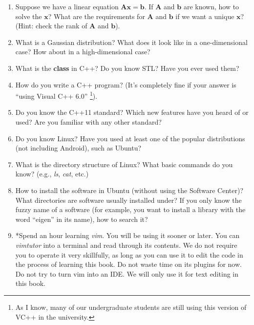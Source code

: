 \begin{English}
    \begin{enumerate}
    	\item Suppose we have a linear equation $\mathbf{Ax}=\mathbf{b}$. If $\mathbf{A}$ and $\mathbf{b}$ are known, how to solve the $\mathbf{x}$? What are the requirements for $\mathbf{A}$ and $\mathbf{b}$ if we want a unique $\mathbf{x}$? (Hint: check the rank of $\mathbf{A}$ and $\mathbf{b}$).
    
    	\item What is a Gaussian distribution? What does it look like in a one-dimensional case? How about in a high-dimensional case?
    
    	\item What is the \textbf{class} in C++? Do you know STL? Have you ever used them?
    
    	\item How do you write a C++ program? (It's completely fine if your answer is ``using Visual C++ 6.0'' \footnote{As I know, many of our undergraduate students are still using this version of VC++ in the university. }).
    
    	\item Do you know the C++11 standard? Which new features have you heard of or used? Are you familiar with any other standard?
    
    	\item Do you know Linux? Have you used at least one of the popular distributions (not including Android), such as Ubuntu?
    
    	\item What is the directory structure of Linux? What basic commands do you know? (e.g., \textit{ls}, \textit{cat}, etc.)
    
    	\item How to install the software in Ubuntu (without using the Software Center)? What directories are software usually installed under? If you only know the fuzzy name of a software (for example, you want to install a library with the word ``eigen'' in its name), how to search it?
    
    	\item *Spend an hour learning \textit{vim}. You will be using it sooner or later. You can \textit{vimtutor} into a terminal and read through its contents. We do not require you to operate it very skillfully, as long as you can use it to edit the code in the process of learning this book. Do not waste time on its plugins for now. Do not try to turn vim into an IDE. We will only use it for text editing in this book.
    
    \end{enumerate}
\end{English}

\begin{Russian}
    
\end{Russian}

